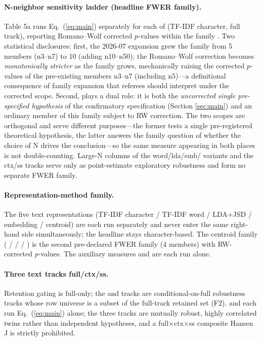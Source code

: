 \paragraph{N-neighbor sensitivity ladder (headline FWER family).}
Table 5a runs Eq.~(\ref{eq:main}) separately for each of
 (TF-IDF character,
full track), reporting Romano--Wolf corrected $p$-values within the
family \parencite{romano2005stepwise}. Two statistical disclosures:
first, the 2026-07 expansion grew the family from 5 members (n3--n7)
to 10 (adding n10--n50); the Romano--Wolf correction becomes
\emph{monotonically stricter} as the family grows, mechanically
raising the corrected $p$-values of the pre-existing members
n3--n7 (including n5)---a definitional consequence of family
expansion that referees should interpret under the corrected scope.
Second,  plays a dual role: it is both the
\emph{uncorrected single pre-specified hypothesis} of the
confirmatory specification (Section \ref{sec:main}) and an ordinary
member of this family subject to RW correction. The two scopes are
orthogonal and serve different purposes---the former tests a single
pre-registered theoretical hypothesis, the latter answers the family
question of whether the choice of N drives the conclusion---so the
same measure appearing in both places is not double-counting.
Large-N columns of the word/lda/emb/ variants and the
ctx/ss tracks serve only as point-estimate exploratory robustness
and form no separate FWER family.

\paragraph{Representation-method family.}
The five text representations (TF-IDF character / TF-IDF word /
LDA+JSD / embedding / centroid) are each run separately and never
enter the same right-hand side simultaneously; the headline stays
character-based. The centroid family
( /  /
 / ) is the second
pre-declared FWER family (4 members) with RW-corrected $p$-values.
The auxiliary measures  and
 are each run alone.

\paragraph{Three text tracks full/ctx/ss.}
Retention gating is full-only; the  and  tracks
are conditional-on-full robustness tracks whose row universe is a
subset of the full-track retained set (F2).
 and  each run
Eq.~(\ref{eq:main}) alone; the three tracks are mutually robust,
highly correlated twins rather than independent hypotheses, and a
full$\times$ctx$\times$ss composite Hansen J is strictly prohibited.

